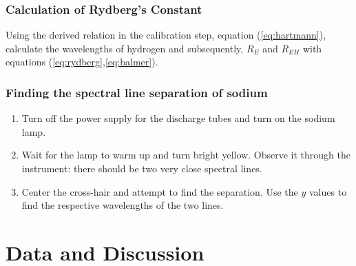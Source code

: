 \documentclass[12pt]{article}
\begin{document}
\subsubsection{Calculation of Rydberg's Constant}
Using the derived relation in the calibration step, equation (\ref{eq:hartmann}), calculate the wavelengths of hydrogen and subsequently, $R_E$ and $R_{EH}$ with equations (\ref{eq:rydberg},\ref{eq:balmer}).
\subsubsection{Finding the spectral line separation of sodium}
\begin{enumerate}
    \item Turn off the power supply for the discharge tubes and turn on the sodium lamp.
    \item Wait for the lamp to warm up and turn bright yellow. Observe it through the instrument: there should be two very close spectral lines.
    \item Center the cross-hair and attempt to find the separation. Use the $y$ values to find the respective wavelengths of the two lines.
\end{enumerate}

\section{Data and Discussion}
\end{document}
